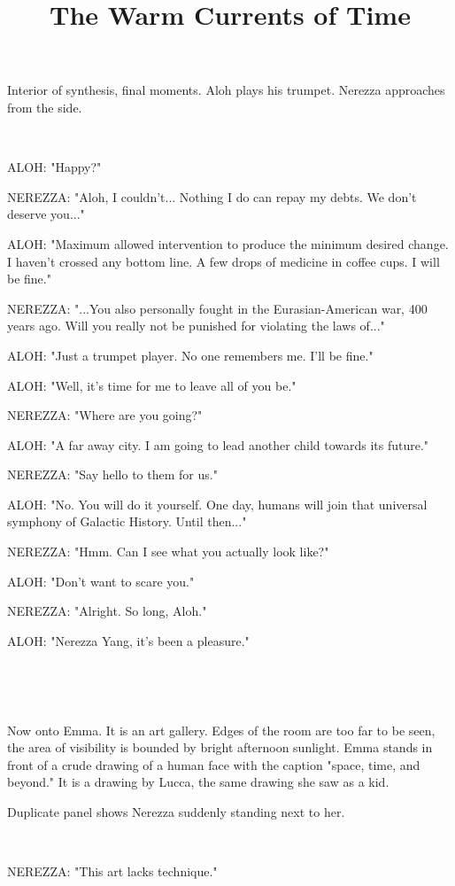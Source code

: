 \documentclass[11pt]{article}
\begin{document}
\ttfamily
\title{The Warm Currents of Time}
\maketitle

Interior of synthesis, final moments.
Aloh plays his trumpet.
Nerezza approaches from the side.

\ 

ALOH: "Happy?"

NEREZZA: "Aloh, I couldn't... 
Nothing I do can repay my debts.
We don't deserve you..."

ALOH: "Maximum allowed intervention to produce the minimum desired change.
I haven't crossed any bottom line. 
A few drops of medicine in coffee cups.
I will be fine."

NEREZZA: "...You also personally fought in the Eurasian-American war, 400 years ago. 
Will you really not be punished for violating the laws of..."

ALOH: "Just a trumpet player. No one remembers me. I'll be fine."

ALOH: "Well, it's time for me to leave all of you be."

NEREZZA: "Where are you going?"

ALOH: "A far away city. I am going to lead another child towards its future."

NEREZZA: "Say hello to them for us."

ALOH: "No. You will do it yourself.
One day, humans will join that universal symphony of Galactic History.
Until then..."

NEREZZA: "Hmm. Can I see what you actually look like?"

ALOH: "Don't want to scare you."

NEREZZA: "Alright. So long, Aloh."

ALOH: "Nerezza Yang, it's been a pleasure."

\ 

\ 

Now onto Emma.
It is an art gallery. 
Edges of the room are too far to be seen, the area of visibility is bounded by bright afternoon sunlight.
Emma stands in front of a crude drawing of a human face with the caption "space, time, and beyond."
It is a drawing by Lucca, the same drawing she saw as a kid.

Duplicate panel shows Nerezza suddenly standing next to her.

\ 

NEREZZA: "This art lacks technique."
\end{document}
